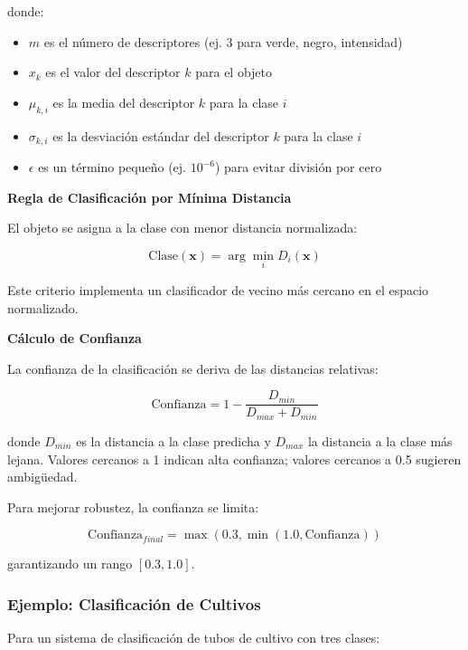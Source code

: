 donde:
\begin{itemize}
\item $m$ es el número de descriptores (ej. 3 para verde, negro, intensidad)
\item $x_k$ es el valor del descriptor $k$ para el objeto
\item $\mu_{k,i}$ es la media del descriptor $k$ para la clase $i$
\item $\sigma_{k,i}$ es la desviación estándar del descriptor $k$ para la clase $i$
\item $\epsilon$ es un término pequeño (ej. $10^{-6}$) para evitar división por cero
\end{itemize}

\textbf{Regla de Clasificación por Mínima Distancia}

El objeto se asigna a la clase con menor distancia normalizada:

\begin{equation}
\text{Clase}(\mathbf{x}) = \arg\min_{i} D_i(\mathbf{x})
\end{equation}

Este criterio implementa un clasificador de vecino más cercano en el espacio normalizado.

\textbf{Cálculo de Confianza}

La confianza de la clasificación se deriva de las distancias relativas:

\begin{equation}
\text{Confianza} = 1 - \frac{D_{min}}{D_{max} + D_{min}}
\end{equation}

donde $D_{min}$ es la distancia a la clase predicha y $D_{max}$ la distancia a la clase más lejana. Valores cercanos a 1 indican alta confianza; valores cercanos a 0.5 sugieren ambigüedad.

Para mejorar robustez, la confianza se limita:

\begin{equation}
\text{Confianza}_{final} = \max(0.3, \min(1.0, \text{Confianza}))
\end{equation}

garantizando un rango $[0.3, 1.0]$.

\subsubsection{Ejemplo: Clasificación de Cultivos}

Para un sistema de clasificación de tubos de cultivo con tres clases:

